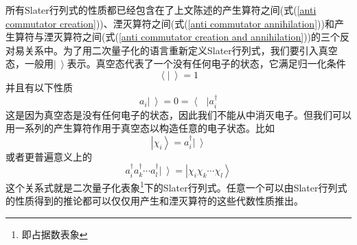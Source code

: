 \documentclass[12pt,a4paper,openany,twoside]{book}
\numberwithin{equation}{section}
\begin{document}
          所有Slater行列式的性质都已经包含在了上文陈述的产生算符之间(式(\ref{anti commutator creation}))、湮灭算符之间(式(\ref{anti commutator annihilation}))和产生算符与湮灭算符之间(式(\ref{anti commutator creation and annihilation}))的三个反对易关系中。为了用二次量子化的语言重新定义Slater行列式，我们要引入真空态，一般用$\left|\ \right\rangle$表示。真空态代表了一个没有任何电子的状态，它满足归一化条件
          \begin{equation}
            \left\langle\right.\left|\ \right\rangle=1
          \end{equation}
          并且有以下性质
          \begin{equation}
            a_i\left|\ \right\rangle=0=\left\langle\text{\  }\right|a_i^\dagger
          \end{equation}
          这是因为真空态是没有任何电子的状态，因此我们不能从中消灭电子。但我们可以用一系列的产生算符作用于真空态以构造任意的电子状态。比如
          \begin{equation}
            \left|\chi_i\right\rangle=a_i^\dagger\left|\ \right\rangle
          \end{equation}
          或者更普遍意义上的
          \begin{equation}
            a_i^\dagger a_k^\dagger\cdots a_l^\dagger\left|\ \right\rangle=\left|\chi_i
            \chi_k\cdots\chi_l\right\rangle
          \end{equation}
          这个关系式就是二次量子化表象\footnote{即占据数表象}下的Slater行列式。任意一个可以由Slater行列式的性质得到的推论都可以仅仅用产生和湮灭算符的这些代数性质推出。
          
\end{document}

